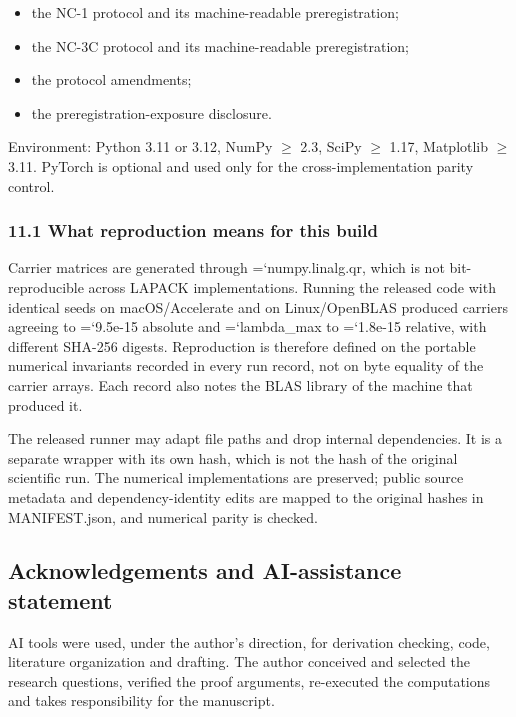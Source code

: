 \documentclass[
  10pt,
]{article}
\providecommand{\tightlist}{%
  \setlength{\itemsep}{0pt}\setlength{\parskip}{0pt}}
\renewcommand{\texttt}[1]{\begingroup\ttfamily\hyphenchar\font=`\-\relax\spaceskip=0pt\hskip0pt\allowbreak#1\endgroup}
\begin{document}
\begin{itemize}
\tightlist
\item
  the NC-1 protocol and its machine-readable preregistration;
\item
  the NC-3C protocol and its machine-readable preregistration;
\item
  the protocol amendments;
\item
  the preregistration-exposure disclosure.
\end{itemize}

Environment: Python 3.11 or 3.12, NumPy \(\ge\) 2.3, SciPy \(\ge\) 1.17,
Matplotlib \(\ge\) 3.11. PyTorch is optional and used only for the
cross-implementation parity control.

\subsubsection{11.1 What reproduction means for this
build}\label{what-reproduction-means-for-this-build}

Carrier matrices are generated through \texttt{numpy.linalg.qr}, which
is not bit-reproducible across LAPACK implementations. Running the
released code with identical seeds on macOS/Accelerate and on
Linux/OpenBLAS produced carriers agreeing to \texttt{9.5e-15} absolute
and \texttt{lambda\_max} to \texttt{1.8e-15} relative, with different
SHA-256 digests. Reproduction is therefore defined on the portable
numerical invariants recorded in every run record, not on byte equality
of the carrier arrays. Each record also notes the BLAS library of the
machine that produced it.

The released runner may adapt file paths and drop internal dependencies.
It is a separate wrapper with its own hash, which is not the hash of the
original scientific run. The numerical implementations are preserved;
public source metadata and dependency-identity edits are mapped to the
original hashes in MANIFEST.json, and numerical parity is checked.

\subsection{Acknowledgements and AI-assistance
statement}\label{acknowledgements-and-ai-assistance-statement}

AI tools were used, under the author's direction, for derivation
checking, code, literature organization and drafting. The author
conceived and selected the research questions, verified the proof
arguments, re-executed the computations and takes responsibility for the
manuscript.
\end{document}
